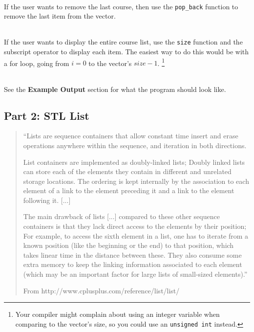         ~\\ If the user wants to remove the last course, then use the
        \texttt{pop\_back} function to remove the last item from the vector.

        ~\\ If the user wants to display the entire course list, use the
        \texttt{size} function and the subscript operator to display each item.
        The easiest way to do this would be with a for loop, going from $i = 0$ to
        the vector's $size-1$.
        \footnote{Your compiler might complain about using an integer variable when
        comparing to the vector's size, so you could use an \texttt{unsigned int} instead.}

        ~\\ See the \textbf{Example Output} section for what the program should look like.


        \newpage
        \subsection{Part 2: STL List}

        \begin{mdframed}
            \begin{quote}
                ``Lists are sequence containers that allow constant time insert and erase operations anywhere within the sequence, and iteration in both directions.

                    List containers are implemented as doubly-linked lists; Doubly linked lists can store each of the elements they contain in different and unrelated
                    storage locations. The ordering is kept internally by the association to each element of a link to the element preceding it and a link to the element following it.
                    [...]

                    The main drawback of lists [...] compared to these other sequence containers is that they lack direct access to the elements by their
                    position; For example, to access the sixth element in a list, one has to iterate from a known position (like the beginning or the end) to that position,
                    which takes linear time in the distance between these. They also consume some extra memory to keep the linking information associated to each element
                    (which may be an important factor for large lists of small-sized elements).''

                \footnotesize{From http://www.cplusplus.com/reference/list/list/}
            \end{quote}
        \end{mdframed}

